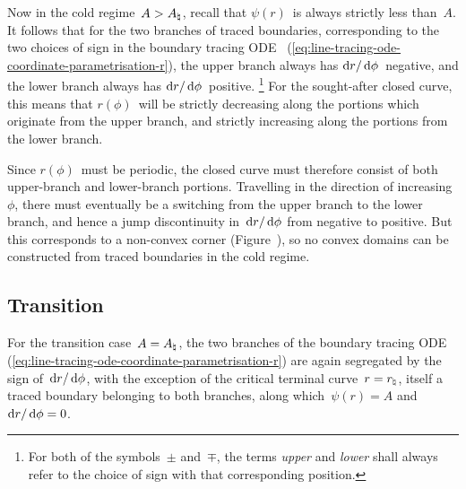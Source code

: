 Now in the cold regime~$A > A_\natural$,
recall that $\psi (r)$~is always strictly less than~$A$.
It follows that for the two branches of traced boundaries,
corresponding to the two choices of sign in the boundary tracing ODE~%
  (\ref{eq:line-tracing-ode-coordinate-parametrisation-r}),
the upper branch always has $\mathop{}\!\mathrm{d} r / \mathop{}\!\mathrm{d}\phi$~negative,
and the lower branch always has $\mathop{}\!\mathrm{d} r / \mathop{}\!\mathrm{d}\phi$~positive.%
\footnote{
  For both of the symbols~$\pm$ and~$\mp$,
  the terms \emph{upper} and \emph{lower}
  shall always refer to the choice of sign with that corresponding position.
}
For the sought-after closed curve,
this means that $r (\phi)$~will be strictly decreasing
along the portions which originate from the upper branch,
and strictly increasing along the portions from the lower branch.

Since $r (\phi)$~must be periodic,
the closed curve must therefore consist of both
upper-branch and lower-branch portions.
Travelling in the direction of increasing~$\phi$,
there must eventually be a switching
from the upper branch to the lower branch,
and hence a jump discontinuity in~$\mathop{}\!\mathrm{d} r / \mathop{}\!\mathrm{d}\phi$
from negative to positive.
But this corresponds to a non-convex corner
(Figure~\tbd),
so no convex domains can be constructed from traced boundaries
in the cold regime.

\subsection{Transition}
\label{sec:polar.tracing.transition}

For the transition case~$A = A_\natural$,
the two branches of the boundary tracing ODE~%
  (\ref{eq:line-tracing-ode-coordinate-parametrisation-r})
are again segregated by the sign of~$\mathop{}\!\mathrm{d} r / \mathop{}\!\mathrm{d}\phi$,
with the exception of the critical terminal curve~$r = r_\natural$,
itself a traced boundary belonging to both branches,
along which~$\psi (r) = A$ and~$\mathop{}\!\mathrm{d} r / \mathop{}\!\mathrm{d}\phi = 0$.


